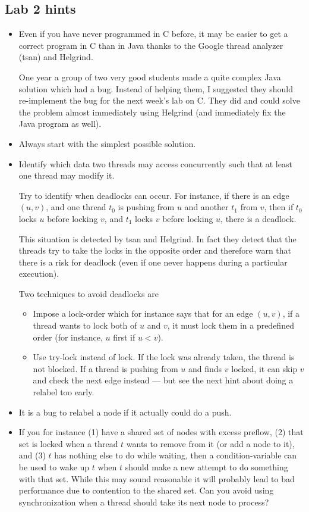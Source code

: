 \documentclass{forsete}
\begin{document}
\subsection*{Lab 2 hints}
\begin{itemize}
\item Even if you have never programmed in C before, it may be easier 
to get a correct program in C than in Java thanks to the Google thread analyzer (tsan) and Helgrind.

One year a group of two very good students made a quite complex Java 
solution which had a bug. Instead of helping them, I suggested they should
re-implement the bug for the next week's lab on C. They did and could solve
the problem almost immediately using Helgrind (and immediately fix the Java program as well).

\item Always start with the simplest possible solution.

\item Identify which data two threads may access concurrently such that at
least one thread may modify it.

Try to identify when deadlocks can occur. For instance, if there is
an edge $(u,v)$, and one thread $t_0$ is pushing from $u$ and another $t_1$
from $v$, then if $t_0$ locks $u$ before locking $v$, and $t_1$ 
locks $v$ before locking $u$, there is a deadlock.

This situation is detected by tsan and Helgrind. In fact they detect
that the threads try to take the locks in the opposite order and therefore
warn that there is a risk for deadlock (even if one never happens during
a particular execution).

Two techniques to avoid deadlocks are 
\begin{itemize}
\item Impose a lock-order which for instance says that for an edge $(u,v)$,
if a thread wants to lock both of $u$ and $v$, it must lock them in a
predefined order (for instance, $u$ first if $u < v$).
\item Use try-lock instead of lock. If the lock was already taken,
the thread is not blocked. If a thread is pushing from $u$ and finds $v$
locked, it can skip $v$ and check the next edge instead --- but see the
next hint about doing a relabel too early.
\end{itemize}

\item It is a bug to relabel a node if it actually could do a push.

\item If you for instance (1) have a shared set of nodes with excess 
preflow, (2) that set is locked when a thread $t$ wants to remove from it (or
add a node to it), and (3) $t$ has nothing else to do while waiting,
then a condition-variable can be used to wake up $t$ when $t$ should make
a new attempt to do something with that set. While this may sound reasonable
it will probably lead to bad performance due to contention to the shared set.
Can you avoid using synchronization when a thread should take its next node
to process?
\end{itemize}
\end{document}
